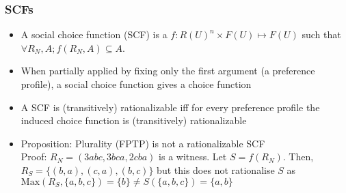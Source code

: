 \documentclass[20pt,a4paper,landscape]{extarticle}
\begin{document}
\begin{flushleft}
\subsubsection{SCFs}
\begin{itemize}
\item A social choice function (SCF) is a $f: R(U)^n \times F(U) \mapsto F(U)$ such that $\forall R_N, A; f(R_N, A) \subseteq A$.
\item When partially applied by fixing only the first argument (a preference profile), a social choice function gives a choice function
\item{A SCF is (transitively) rationalizable iff for every preference profile the induced choice function is (transitively) rationalizable}
\item{Proposition: Plurality (FPTP) is not a rationalizable SCF\\
Proof: $R_N = (3abc, 3bca, 2cba)$ is a witness. Let $S = f(R_N)$. Then, $R_S = \{(b, a), (c, a), (b, c)\}$ but this does not rationalise $S$ as $\textrm{Max}(R_S, \{a, b, c\}) = \{b\} \neq S(\{a,b,c\}) = \{a, b\}$}
\end{itemize}
\clearpage

\end{flushleft}
\end{document}
